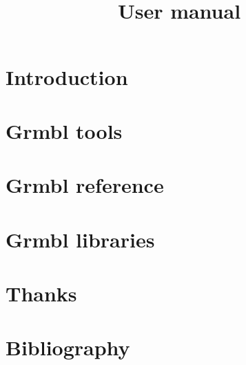 

\title{\Grmbl \\ User manual}


\maketitle
\tableofcontents

\part{Introduction}






\part{Grmbl tools}



\part{Grmbl reference}






\part{Grmbl libraries}




\part{Thanks}



\part{Bibliography}



